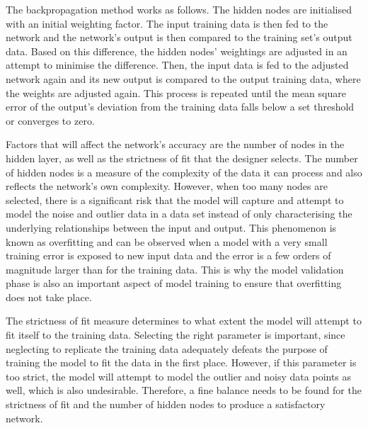 The backpropagation method works as follows. The hidden nodes are initialised with an initial weighting factor. The input training data is then fed to the network and the network's output is then compared to the training set's output data. Based on this difference, the hidden nodes' weightings are adjusted in an attempt to minimise the difference. Then, the input data is fed to the adjusted network again and its new output is compared to the output training data, where the weights are adjusted again. This process is repeated until the mean square error of the output's deviation from the training data falls below a set threshold or converges to zero. 

Factors that will affect the network's accuracy are the number of nodes in the hidden layer, as well as the strictness of fit that the designer selects. The number of hidden nodes is a measure of the complexity of the data it can process and also reflects the network's own complexity. However, when too many nodes are selected, there is a significant risk that the model will capture and attempt to model the noise and outlier data in a data set instead of only characterising the underlying relationships between the input and output. This phenomenon is known as overfitting and can be observed when a model with a very small training error is exposed to new input data and the error is a few orders of magnitude larger than for the training data. This is why the model validation phase is also an important aspect of model training to ensure that overfitting does not take place. 

The strictness of fit measure determines to what extent the model will attempt to fit itself to the training data. Selecting the right parameter is important, since neglecting to replicate the training data adequately defeats the purpose of training the model to fit the data in the first place. However, if this parameter is too strict, the model will attempt to model the outlier and noisy data points as well, which is also undesirable. Therefore, a fine balance needs to be found for the strictness of fit and the number of hidden nodes to produce a satisfactory network.  

